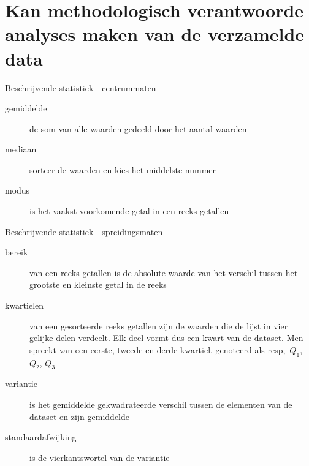 \section{Kan methodologisch verantwoorde analyses maken van de verzamelde data }
\sectionframe{}

\begin{frame}{Beschrijvende statistiek - centrummaten}
	
	\begin{description}
		\item[gemiddelde] de som van alle waarden gedeeld door het aantal waarden
		\item[mediaan] sorteer de waarden en kies het middelste nummer
		\item[modus] is het vaakst voorkomende getal in een reeks getallen
	\end{description}
\end{frame}

\begin{frame}{Beschrijvende statistiek - spreidingsmaten}
	\begin{description}
		\item[bereik] van een reeks getallen is de absolute waarde van het verschil tussen het grootste en kleinste getal in de reeks
		\item[kwartielen] van een gesorteerde reeks getallen zijn de waarden die de lijst in vier gelijke delen verdeelt. Elk deel vormt dus een kwart van de dataset. Men spreekt van een eerste, tweede en derde kwartiel, genoteerd als resp,~$Q_1$, $Q_2$, $Q_3$
		\item[variantie] is het gemiddelde gekwadrateerde verschil tussen de elementen van de dataset en zijn gemiddelde
		\item[standaardafwijking] is de vierkantswortel van de variantie
	\end{description}
\end{frame}